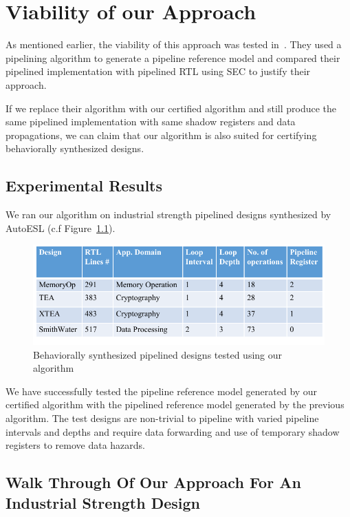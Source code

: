 \chapter{Viability of our Approach}
\label{sec:SEC}

As mentioned earlier, the viability of this approach was tested in~\cite{kechengthesis}. 
They used a pipelining algorithm to generate a pipeline reference model and compared their pipelined 
implementation with pipelined RTL using SEC to justify their approach. 

If we replace their algorithm with our certified algorithm and still produce the same pipelined implementation with same shadow registers and data propagations, we can claim that our algorithm is also suited for certifying behaviorally synthesized designs. 

\section{Experimental Results}

We ran our algorithm on industrial strength pipelined designs synthesized by AutoESL (c.f Figure~\ref{fig:testing}). 


\begin{figure}[h]
\begin{center}
\includegraphics[width=5.5in]{fig-proposal/testing}
\end{center}
\caption{Behaviorally synthesized pipelined designs tested using our algorithm}
\label{fig:testing}
\end{figure}


We have successfully tested the pipeline reference model generated by our certified algorithm with the pipelined reference model generated by the previous algorithm. The test designs are non-trivial to pipeline with varied pipeline intervals and depths and require data forwarding and use of temporary shadow registers to remove data hazards. 

\section{Walk Through Of Our Approach For An Industrial Strength Design}

